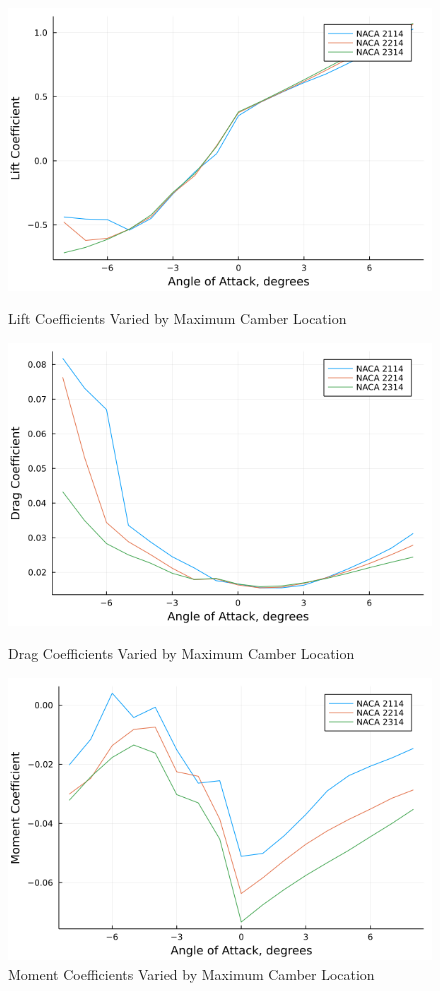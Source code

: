 \documentclass{article}
\begin{document}
\begin{figure}[!htb]
  \includegraphics[width=\linewidth]{Figure16.png}
  \caption{Lift Coefficients Varied by Maximum Camber Location}\label{fig:16}
\endminipage\hfill
{}
  \includegraphics[width=\linewidth]{Figure17.png}
  \caption{Drag Coefficients Varied by Maximum Camber Location}\label{fig:17}
\endminipage\hfill
{}
  \includegraphics[width=\linewidth]{Figure18.png}
  \caption{Moment Coefficients Varied by Maximum Camber Location}\label{fig:18}
\endminipage
\end{figure}
\end{document}
